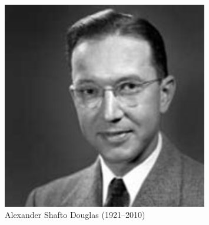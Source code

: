 \documentclass[10pt]{beamer}
\begin{document}
{\begin{columns}[T]
		\begin{column}{0.33\textwidth}
			\begin{figure}
			\centering
			\includegraphics[width=0.8\textwidth]{alexander_douglas.jpg}
			\caption{\centering Alexander Shafto Douglas (1921–2010)}
			\end{figure}
		\end{column}
	\end{columns}
	
}
\end{document}
